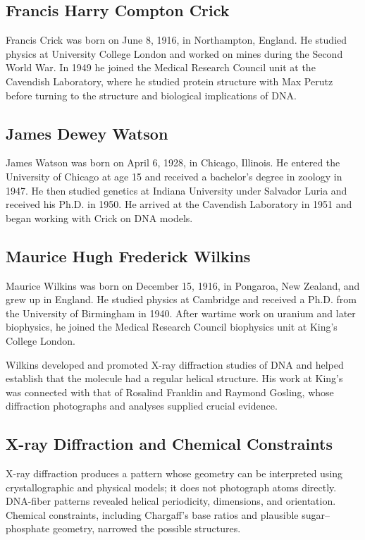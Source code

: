 \subsection{Francis Harry Compton Crick}

Francis Crick was born on June 8, 1916, in Northampton, England. He studied physics at University College London and worked on mines during the Second World War. In 1949 he joined the Medical Research Council unit at the Cavendish Laboratory, where he studied protein structure with Max Perutz before turning to the structure and biological implications of DNA.

\subsection{James Dewey Watson}

James Watson was born on April 6, 1928, in Chicago, Illinois. He entered the University of Chicago at age 15 and received a bachelor's degree in zoology in 1947. He then studied genetics at Indiana University under Salvador Luria and received his Ph.D. in 1950. He arrived at the Cavendish Laboratory in 1951 and began working with Crick on DNA models.

\subsection{Maurice Hugh Frederick Wilkins}

Maurice Wilkins was born on December 15, 1916, in Pongaroa, New Zealand, and grew up in England. He studied physics at Cambridge and received a Ph.D. from the University of Birmingham in 1940. After wartime work on uranium and later biophysics, he joined the Medical Research Council biophysics unit at King's College London.

Wilkins developed and promoted X-ray diffraction studies of DNA and helped establish that the molecule had a regular helical structure. His work at King's was connected with that of Rosalind Franklin and Raymond Gosling, whose diffraction photographs and analyses supplied crucial evidence.

\subsection{X-ray Diffraction and Chemical Constraints}

X-ray diffraction produces a pattern whose geometry can be interpreted using crystallographic and physical models; it does not photograph atoms directly. DNA-fiber patterns revealed helical periodicity, dimensions, and orientation. Chemical constraints, including Chargaff's base ratios and plausible sugar--phosphate geometry, narrowed the possible structures.

